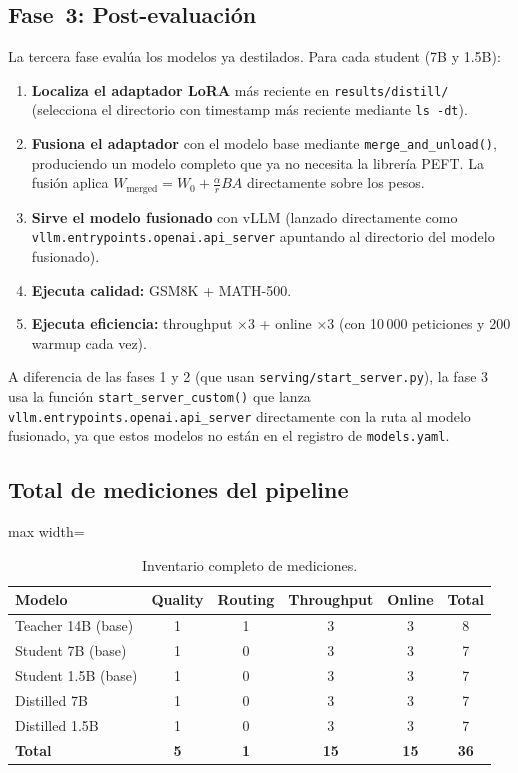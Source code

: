 \documentclass[11pt,a4paper]{article}
\begin{document}
\subsection{Fase~3: Post-evaluaci\'on}

La tercera fase eval\'ua los modelos ya destilados. Para cada student
(7B y 1.5B):

\begin{enumerate}
  \item \textbf{Localiza el adaptador LoRA} m\'as reciente en
    \texttt{results/distill/} (selecciona el directorio con timestamp
    m\'as reciente mediante \texttt{ls -dt}).
  \item \textbf{Fusiona el adaptador} con el modelo base mediante
    \texttt{merge\_and\_unload()}, produciendo un modelo completo que
    ya no necesita la librer\'ia PEFT. La fusi\'on aplica
    $W_{\text{merged}} = W_0 + \frac{\alpha}{r} B A$ directamente
    sobre los pesos.
  \item \textbf{Sirve el modelo fusionado} con vLLM (lanzado
    directamente como \texttt{vllm.entrypoints.openai.api\_server}
    apuntando al directorio del modelo fusionado).
  \item \textbf{Ejecuta calidad:} GSM8K + MATH-500.
  \item \textbf{Ejecuta eficiencia:} throughput $\times$3 + online
    $\times$3 (con 10\,000 peticiones y 200 warmup cada vez).
\end{enumerate}

A diferencia de las fases 1 y 2 (que usan \texttt{serving/start\_server.py}),
la fase 3 usa la funci\'on \texttt{start\_server\_custom()} que lanza
\texttt{vllm.entrypoints.openai.api\_server} directamente con la ruta
al modelo fusionado, ya que estos modelos no est\'an en el registro
de \texttt{models.yaml}.

\subsection{Total de mediciones del pipeline}

\begin{table}[H]
\centering
\caption{Inventario completo de mediciones.}
\label{tab:total-measurements}
\begin{adjustbox}{max width=\textwidth}
\begin{tabular}{@{}lccccc@{}}
\toprule
\textbf{Modelo} & \textbf{Quality} & \textbf{Routing}
    & \textbf{Throughput} & \textbf{Online} & \textbf{Total} \\
\midrule
Teacher 14B (base)     & 1 & 1 & 3 & 3 & 8 \\
Student 7B (base)      & 1 & 0 & 3 & 3 & 7 \\
Student 1.5B (base)    & 1 & 0 & 3 & 3 & 7 \\
Distilled 7B           & 1 & 0 & 3 & 3 & 7 \\
Distilled 1.5B         & 1 & 0 & 3 & 3 & 7 \\
\midrule
\textbf{Total}         & \textbf{5} & \textbf{1}
    & \textbf{15} & \textbf{15} & \textbf{36} \\
\bottomrule
\end{tabular}
\end{adjustbox}
\end{table}
\end{document}
